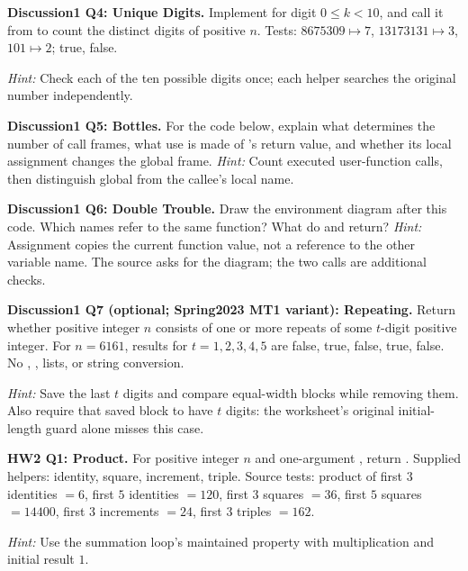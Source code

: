 \begin{prob}
\textbf{Discussion1 Q4: Unique Digits.} Implement  for digit $0\le k<10$, and call it from  to count the distinct digits of positive $ n $. Tests: $8675309\mapsto7$, $13173131\mapsto3$, $101\mapsto2$;  true,  false.\par
\emph{Hint:} Check each of the ten possible digits once; each helper searches the original number independently.
\end{prob}
\begin{prob}
\textbf{Discussion1 Q5: Bottles.} For the code below, explain what determines the number of call frames, what use is made of 's return value, and whether its local assignment changes the global frame.
\emph{Hint:} Count executed user-function calls, then distinguish global  from the callee's local name.
\end{prob}
\begin{prob}
\textbf{Discussion1 Q6: Double Trouble.} Draw the environment diagram after this code. Which names refer to the same function? What do  and  return?
\emph{Hint:} Assignment copies the current function value, not a reference to the other variable name. The source asks for the diagram; the two calls are additional checks.
\end{prob}
\begin{prob}
\textbf{Discussion1 Q7 (optional; Spring2023 MT1 variant): Repeating.} Return whether positive integer $ n $ consists of one or more repeats of some $ t $-digit positive integer. For $ n=6161$, results for $ t=1,2,3,4,5$ are false, true, false, true, false. No , , lists, or string conversion.\par
\emph{Hint:} Save the last $ t $ digits and compare equal-width blocks while removing them. Also require that saved block to have $ t $ digits: the worksheet's original initial-length guard alone misses this case.
\end{prob}
\begin{prob}
\textbf{HW2 Q1: Product.} For positive integer $ n $ and one-argument , return . Supplied helpers: identity, square, increment, triple. Source tests: product of first $3$ identities $=6$, first $5$ identities $=120$, first $3$ squares $=36$, first $5$ squares $=14400$, first $3$ increments $=24$, first $3$ triples $=162$.\par
\emph{Hint:} Use the summation loop's maintained property with multiplication and initial result $1$.
\end{prob}
